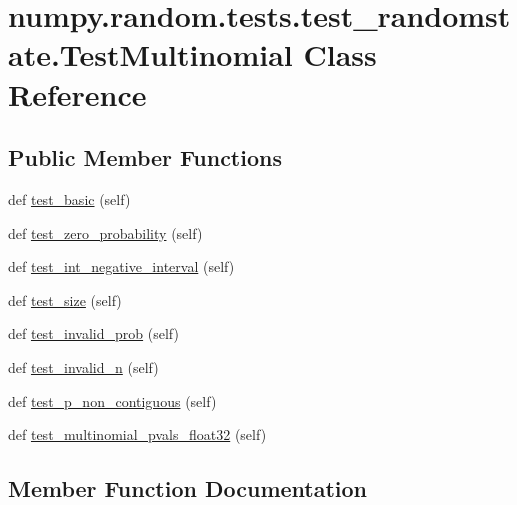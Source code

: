 \hypertarget{classnumpy_1_1random_1_1tests_1_1test__randomstate_1_1TestMultinomial}{}\section{numpy.\+random.\+tests.\+test\+\_\+randomstate.\+Test\+Multinomial Class Reference}
\label{classnumpy_1_1random_1_1tests_1_1test__randomstate_1_1TestMultinomial}
\subsection*{Public Member Functions}
\begin{DoxyCompactItemize}
\item 
def \hyperlink{classnumpy_1_1random_1_1tests_1_1test__randomstate_1_1TestMultinomial_ac8c307cf93f8b04ce8d560e6aee77d1d}{test\+\_\+basic} (self)
\item 
def \hyperlink{classnumpy_1_1random_1_1tests_1_1test__randomstate_1_1TestMultinomial_a6617599663916c48145f9c99aa317ec9}{test\+\_\+zero\+\_\+probability} (self)
\item 
def \hyperlink{classnumpy_1_1random_1_1tests_1_1test__randomstate_1_1TestMultinomial_a17ffe118f3b16e619cd233fd71ac68b1}{test\+\_\+int\+\_\+negative\+\_\+interval} (self)
\item 
def \hyperlink{classnumpy_1_1random_1_1tests_1_1test__randomstate_1_1TestMultinomial_ad165e177454c77f925928d1662fc148c}{test\+\_\+size} (self)
\item 
def \hyperlink{classnumpy_1_1random_1_1tests_1_1test__randomstate_1_1TestMultinomial_a9231b6c18663a8f10c0f49ad447e185d}{test\+\_\+invalid\+\_\+prob} (self)
\item 
def \hyperlink{classnumpy_1_1random_1_1tests_1_1test__randomstate_1_1TestMultinomial_a0436a878e7265367ba967b607e189c36}{test\+\_\+invalid\+\_\+n} (self)
\item 
def \hyperlink{classnumpy_1_1random_1_1tests_1_1test__randomstate_1_1TestMultinomial_abaf88ad7ad0fd00b5053a62e337fff45}{test\+\_\+p\+\_\+non\+\_\+contiguous} (self)
\item 
def \hyperlink{classnumpy_1_1random_1_1tests_1_1test__randomstate_1_1TestMultinomial_a074dd0acb7e72d2791cd9673fc085d25}{test\+\_\+multinomial\+\_\+pvals\+\_\+float32} (self)
\end{DoxyCompactItemize}


\subsection{Member Function Documentation}
\mbox{\label{classnumpy_1_1random_1_1tests_1_1test__randomstate_1_1TestMultinomial_ac8c307cf93f8b04ce8d560e6aee77d1d}} 

